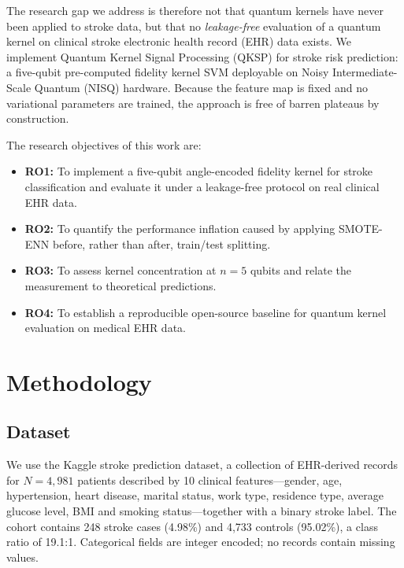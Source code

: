 \documentclass{ws-ijqi}
\begin{document}
The research gap we address is therefore not that quantum kernels have never
been applied to stroke data, but that no \emph{leakage-free} evaluation of a
quantum kernel on clinical stroke electronic health record (EHR) data exists.
We implement Quantum Kernel Signal Processing (QKSP) for stroke risk
prediction: a five-qubit pre-computed fidelity kernel SVM deployable on Noisy
Intermediate-Scale Quantum (NISQ) hardware.\cite{preskill2018} Because the
feature map is fixed and no variational parameters are trained, the approach is
free of barren plateaus by construction.\cite{mcclean2018}

\noindent The research objectives of this work are:

\begin{itemize}
\item[] \textbf{RO1:} To implement a five-qubit angle-encoded fidelity kernel
for stroke classification and evaluate it under a leakage-free protocol on
real clinical EHR data.
\item[] \textbf{RO2:} To quantify the performance inflation caused by applying
SMOTE-ENN before, rather than after, train/test splitting.
\item[] \textbf{RO3:} To assess kernel concentration at $n=5$ qubits and relate
the measurement to theoretical predictions.\cite{thanasilp2024}
\item[] \textbf{RO4:} To establish a reproducible open-source baseline for
quantum kernel evaluation on medical EHR data.
\end{itemize}

\section{Methodology}
\label{sec:method}

\subsection{Dataset}
\label{sec:data}

We use the Kaggle stroke prediction dataset,\cite{fedesoriano2021} a collection
of EHR-derived records for $N=4{,}981$ patients described by 10 clinical
features---gender, age, hypertension, heart disease, marital status, work type,
residence type, average glucose level, BMI and smoking status---together with a
binary stroke label. The cohort contains 248 stroke cases (4.98\%) and 4,733
controls (95.02\%), a class ratio of 19.1:1. Categorical fields are integer
encoded; no records contain missing values.
\end{document}

